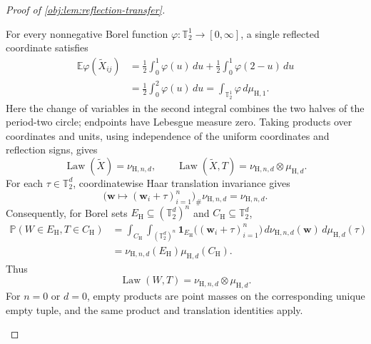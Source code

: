 \documentclass[11pt]{article}
\begin{document}
\begin{proof}[Proof of \cref{obj:lem:reflection-transfer}]
\begin{enumerate}
For every nonnegative Borel function
\(\varphi:\mathbb T_2^1\to[0,\infty]\), a single reflected coordinate
satisfies
\[
\begin{aligned}
\mathbb E\varphi(\widetilde X_{ij})
&=\frac12\int_0^1\varphi(u)\,du
  +\frac12\int_0^1\varphi(2-u)\,du\\
&=\frac12\int_0^2\varphi(u)\,du
 =\int_{\mathbb T_2^1}\varphi\,d\mu_{\mathrm H,1}.
\end{aligned}
\]
Here the change of variables in the second integral combines the two
halves of the period-two circle; endpoints have Lebesgue measure zero.
Taking products over coordinates and units, using independence of the
uniform coordinates and reflection signs, gives
\[
\operatorname{Law}(\widetilde X)=\nu_{\mathrm H,n,d},
\qquad
\operatorname{Law}(\widetilde X,T)
=\nu_{\mathrm H,n,d}\otimes\mu_{\mathrm H,d}.
\]
For each \(\tau\in\mathbb T_2^d\), coordinatewise Haar translation
invariance gives
\[
\bigl(\mathbf w\mapsto
(\mathbf w_i+\tau)_{i=1}^n\bigr)_{\#}
\nu_{\mathrm H,n,d}
=\nu_{\mathrm H,n,d}.
\]
Consequently, for Borel sets
\(E_{\mathrm H}\subseteq(\mathbb T_2^d)^n\) and
\(C_{\mathrm H}\subseteq\mathbb T_2^d\),
\[
\begin{aligned}
\mathbb P(W\in E_{\mathrm H},T\in C_{\mathrm H})
&=\int_{C_{\mathrm H}}
  \int_{(\mathbb T_2^d)^n}
  \mathbf1_{E_{\mathrm H}}
  \bigl((\mathbf w_i+\tau)_{i=1}^n\bigr)
  \,d\nu_{\mathrm H,n,d}(\mathbf w)
  \,d\mu_{\mathrm H,d}(\tau)\\
&=\nu_{\mathrm H,n,d}(E_{\mathrm H})
  \mu_{\mathrm H,d}(C_{\mathrm H}).
\end{aligned}
\]
Thus
\[
\operatorname{Law}(W,T)
=\nu_{\mathrm H,n,d}\otimes\mu_{\mathrm H,d}.
\]
For \(n=0\) or \(d=0\), empty products are point masses on the
corresponding unique empty tuple, and the same product and translation
identities apply.


\end{enumerate}
\end{proof}
\end{document}
